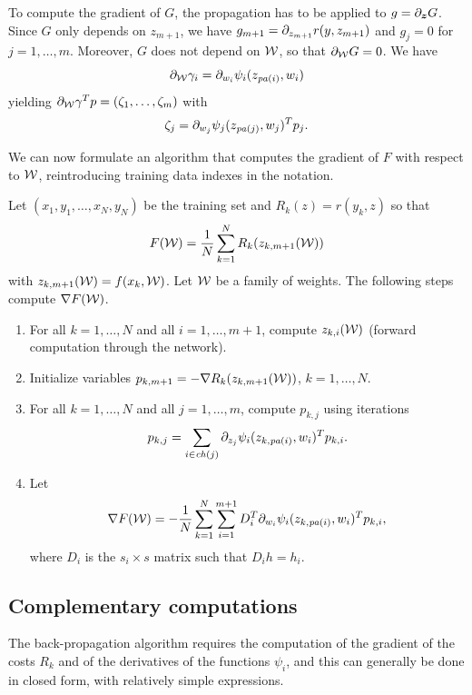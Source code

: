 To compute the gradient of $G$, the propagation has to be applied to $g = \partial_{\bm z} G$. Since $G$ only depends on $z_{m+1}$, we have $g_{m+1} = \partial_{z_{m+1}} r(y, z_{m+1})$ and  $g_j=0$ for $j=1, \ldots, m$. Moreover, $G$ does not depend on ${\mathcal W}$, so that $\partial_{{\mathcal W}} G = 0$. We have
\[
\partial_{{\mathcal W}} \gamma_i = \partial_{w_i} \psi_i(z_{{\mathit{pa}(i)}}, w_i)
\]
yielding $\partial_{{\mathcal W}} \gamma^T p = (\zeta_1, \ldots, \zeta_{m})$ with
\[
\zeta_j = \partial_{w_j} \psi_j(z_{{\mathit{pa}(j)}}, w_j)^T p_j.
\]

We can now formulate an algorithm that computes the gradient of $F$ with respect to ${\mathcal W}$, reintroducing training data indexes in the notation.
\bigskip

\begin{algorithm}
\label{alg:backprop} 
Let $(x_1, y_1, \ldots, x_N, y_N)$ be the training set and $R_k(z) = r(y_k, z)$ so that 
\[
F({\mathcal W}) = \frac1N \sum_{k=1}^N R_k(z_{k, m+1}({\mathcal W}))
\]
 with $z_{k, m+1}({\mathcal W}) = f(x_k, {\mathcal W})$.
 Let ${\mathcal W}$ be a family of weights. The following steps compute $\nabla F({\mathcal W})$.
\begin{enumerate}[label=\arabic*., wide = 0.5cm]
\item For all $k=1, \ldots, N$ and all $i=1, \ldots, m+1$, compute $z_{k,i}({\mathcal W})$ (forward computation through the network).
\item Initialize variables $p_{k, m+1} = -\nabla R_k(z_{k,m+1}({\mathcal W}))$, $k=1, \ldots, N$.
\item For all $k=1, \ldots, N$ and all $j=1, \ldots, m$, compute $p_{k, j}$ using iterations 
\[
p_{k,j} = \sum_{i\in {\mathit{ch}(j)}} \partial_{z_j} \psi_i(z_{k,{\mathit{pa}(i)}}, w_i)^Tp_{k,i}.
\]
\item Let 
\[
\nabla F({\mathcal W}) = -\frac1N \sum_{k=1}^N \sum_{i=1}^{m+1} D_i^T \partial_{w_i} \psi_i(z_{k,{\mathit{pa}(i)}}, w_i)^T p_{k,i},
\]
 where $D_i$ is the $s_i\times s$ matrix such that $D_i h = h_i$.
\end{enumerate}
\end{algorithm}

\subsection{Complementary computations}

 The back-propagation algorithm requires the computation of the gradient of the costs $R_k$ and of the derivatives of the functions $\psi_i$, and this can generally be done in closed form, with relatively simple expressions.
 
